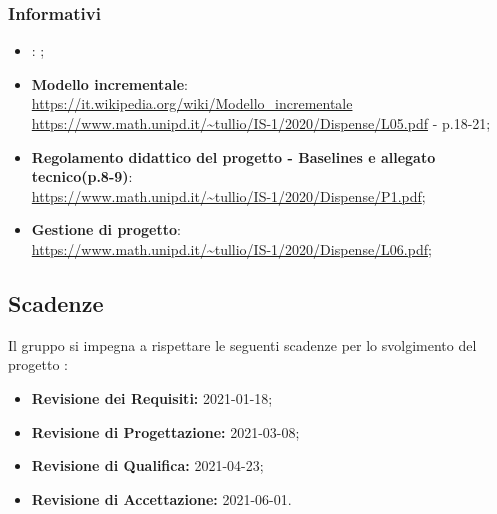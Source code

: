 \subsubsection{Informativi}
\begin{itemize}
\item \textbf{\AdR}: ;
\item \textbf{Modello incrementale}:\\ \url{https://it.wikipedia.org/wiki/Modello_incrementale} \\ \url{https://www.math.unipd.it/~tullio/IS-1/2020/Dispense/L05.pdf} - p.18-21;
\item \textbf{Regolamento didattico del progetto - Baselines e allegato tecnico(p.8-9)}:\\ \url{https://www.math.unipd.it/~tullio/IS-1/2020/Dispense/P1.pdf};
\item \textbf{Gestione di progetto}:\\ \url{https://www.math.unipd.it/~tullio/IS-1/2020/Dispense/L06.pdf};

\end{itemize}

\subsection{Scadenze}
Il gruppo \Omicron{} si impegna a rispettare le seguenti scadenze per lo svolgimento del progetto \nameproject{}:
\begin{itemize}
\item \textbf{Revisione dei Requisiti:} 2021-01-18;
\item \textbf{Revisione di Progettazione:} 2021-03-08;
\item \textbf{Revisione di Qualifica:} 2021-04-23;
\item \textbf{Revisione di Accettazione:} 2021-06-01.
\end{itemize}